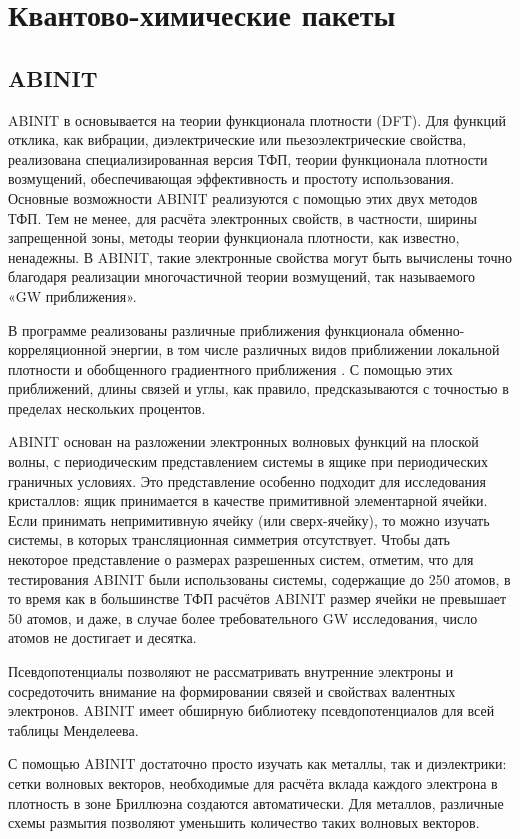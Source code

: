 \chapter{Квантово-химические пакеты}
\section{ABINIT}
ABINIT в основывается на теории функционала плотности (DFT). Для функций отклика, как вибрации, диэлектрические или пьезоэлектрические свойства,  реализована специализированная версия ТФП, теории функционала плотности возмущений, обеспечивающая эффективность и простоту использования. Основные возможности ABINIT реализуются с помощью этих двух методов ТФП. Тем не менее, для расчёта электронных свойств, в частности, ширины запрещенной зоны, методы теории функционала плотности, как известно, ненадежны. В ABINIT, такие электронные свойства могут быть вычислены точно благодаря реализации многочастичной теории возмущений, так называемого «GW приближения».

В программе реализованы различные приближения функционала обменно-корреляционной энергии, в том числе различных видов приближении локальной плотности и обобщенного градиентного приближения . С помощью этих приближений, длины связей и углы, как правило, предсказываются с точностью в пределах нескольких процентов.

ABINIT основан на разложении электронных волновых функций на плоской волны, с периодическим представлением системы в ящике при периодических граничных условиях. Это представление особенно подходит для исследования кристаллов: ящик принимается в качестве примитивной элементарной ячейки. Если принимать непримитивную ячейку (или сверх-ячейку), то можно изучать системы, в которых трансляционная симметрия отсутствует. Чтобы дать некоторое представление о размерах разрешенных систем, отметим, что для тестирования  ABINIT были использованы системы, содержащие до 250 атомов, в то время как в большинстве  ТФП расчётов ABINIT размер ячейки не превышает 50 атомов, и даже, в случае более требовательного GW исследования, число атомов не достигает и десятка.

Псевдопотенциалы позволяют не рассматривать внутренние электроны и сосредоточить внимание на формировании связей и свойствах валентных электронов. ABINIT имеет обширную библиотеку псевдопотенциалов для всей таблицы Менделеева.

С помощью ABINIT достаточно просто изучать как металлы, так и диэлектрики: сетки волновых векторов, необходимые для расчёта вклада каждого электрона в плотность в зоне Бриллюэна создаются автоматически. Для металлов, различные схемы размытия позволяют уменьшить количество таких волновых векторов.


